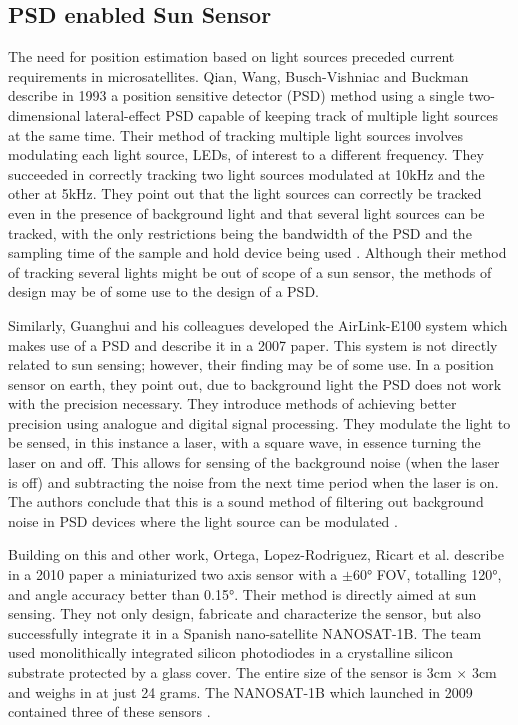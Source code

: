 \subsection{PSD enabled Sun Sensor}
The need for position estimation based on light sources preceded current requirements in microsatellites. Qian, Wang, Busch-Vishniac and Buckman describe in 1993 a position sensitive detector (PSD) method using a single two-dimensional lateral-effect PSD capable of keeping track of multiple light sources at the same time. Their method of tracking multiple light sources involves modulating each light source, LEDs, of interest to a different frequency. They succeeded in correctly tracking two light sources modulated at 10kHz and the other at 5kHz. They point out that the light sources can correctly be tracked even in the presence of background light and that several light sources can be tracked, with the only restrictions being the bandwidth of the PSD and the sampling time of the sample and hold device being used \cite{Qian1993}. Although their method of tracking several lights might be out of scope of a sun sensor, the methods of design may be of some use to the design of a PSD. 

Similarly, Guanghui and his colleagues developed the AirLink-E100 system which makes use of a PSD and describe it in a 2007 paper. This system is not directly related to sun sensing; however, their finding may be of some use. In a position sensor on earth, they point out, due to background light the PSD does not work with the precision necessary. They introduce methods of achieving better precision using analogue and digital signal processing. They modulate the light to be sensed, in this instance a laser, with a square wave, in essence turning the laser on and off. This allows for sensing of the background noise (when the laser is off) and subtracting the noise from the next time period when the laser is on. The authors conclude that this is a sound method of filtering out background noise in PSD devices where the light source can be modulated \cite{Guanghui2007}.

Building on this and other work, Ortega, Lopez-Rodriguez, Ricart et al. describe in a 2010 paper a miniaturized two axis sensor with a $\pm$60° FOV, totalling 120°, and angle accuracy better than 0.15°. Their method is directly aimed at sun sensing. They not only design, fabricate and characterize the sensor, but also successfully integrate it in a Spanish nano-satellite NANOSAT-1B. The team used monolithically integrated silicon photodiodes in a crystalline silicon substrate protected by a glass cover. The entire size of the sensor is 3cm $\times$ 3cm and weighs in at just 24 grams. The NANOSAT-1B which launched in 2009 contained three of these sensors \cite{Ortega2010}. 

